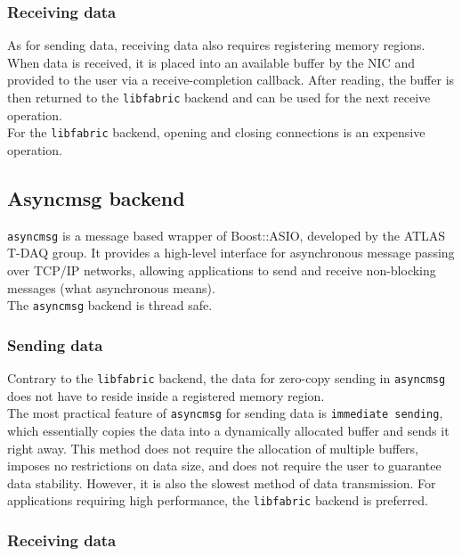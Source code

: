 \subsubsection{Receiving data}

As for sending data, receiving data also requires registering memory regions. When data is received, it is placed into an available buffer by the \acl{NIC} and provided to the user via a receive-completion callback. After reading, the buffer is then returned to the \texttt{libfabric} backend and can be used for the next receive operation.\\
For the \texttt{libfabric} backend, opening and closing connections is an expensive operation.

\subsection{Asyncmsg backend}
\label{subsec:asyncmsg}

\texttt{asyncmsg} is a message based wrapper of Boost::ASIO, developed by the \acs{ATLAS} \acs{T-DAQ} group. It provides a high-level interface for asynchronous message passing over TCP/IP networks, allowing applications to send and receive non-blocking messages (what asynchronous means).\\
The \texttt{asyncmsg} backend is thread safe.

\subsubsection{Sending data}

Contrary to the \texttt{libfabric} backend, the data for zero-copy sending in \texttt{asyncmsg} does not have to reside inside a registered memory region.\\
The most practical feature of \texttt{asyncmsg} for sending data is \texttt{immediate sending}, which essentially copies the data into a dynamically allocated buffer and sends it right away. This method does not require the allocation of multiple buffers, imposes no restrictions on data size, and does not require the user to guarantee data stability. However, it is also the slowest method of data transmission. For applications requiring high performance, the \texttt{libfabric} backend is preferred.

\subsubsection{Receiving data}

